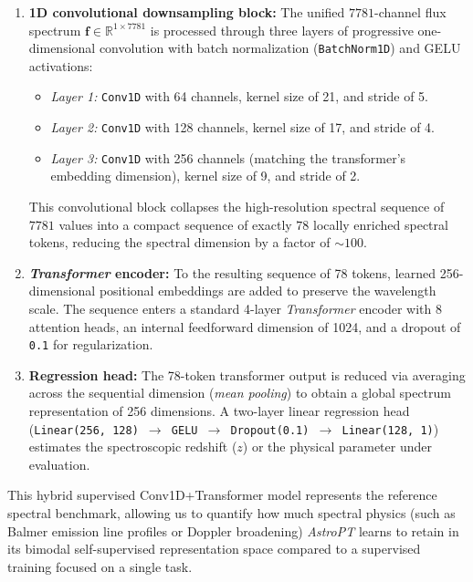 \begin{enumerate}
\item \textbf{1D convolutional downsampling block:} The unified $7781$-channel flux spectrum $\mathbf{f} \in \mathbb{R}^{1 \times 7781}$ is processed through three layers of progressive one-dimensional convolution with batch normalization (\texttt{BatchNorm1D}) and GELU activations:
    \begin{itemize}
    \item \textit{Layer 1:} \texttt{Conv1D} with 64 channels, kernel size of 21, and stride of 5.
    \item \textit{Layer 2:} \texttt{Conv1D} with 128 channels, kernel size of 17, and stride of 4.
    \item \textit{Layer 3:} \texttt{Conv1D} with 256 channels (matching the transformer's embedding dimension), kernel size of 9, and stride of 2.
    \end{itemize}
    This convolutional block collapses the high-resolution spectral sequence of $7781$ values into a compact sequence of exactly $78$ locally enriched spectral tokens, reducing the spectral dimension by a factor of $\sim 100$.
\item \textbf{\textit{Transformer} encoder:} To the resulting sequence of 78 tokens, learned 256-dimensional positional embeddings are added to preserve the wavelength scale. The sequence enters a standard 4-layer \textit{Transformer} encoder with 8 attention heads, an internal feedforward dimension of 1024, and a dropout of \texttt{0.1} for regularization.
\item \textbf{Regression head:} The 78-token transformer output is reduced via averaging across the sequential dimension (\textit{mean pooling}) to obtain a global spectrum representation of 256 dimensions. A two-layer linear regression head (\texttt{Linear(256, 128) $\rightarrow$ GELU $\rightarrow$ Dropout(0.1) $\rightarrow$ Linear(128, 1)}) estimates the spectroscopic redshift ($z$) or the physical parameter under evaluation.
\end{enumerate}

This hybrid supervised Conv1D+Transformer model represents the reference spectral benchmark, allowing us to quantify how much spectral physics (such as Balmer emission line profiles or Doppler broadening) \textit{AstroPT} learns to retain in its bimodal self-supervised representation space compared to a supervised training focused on a single task.
